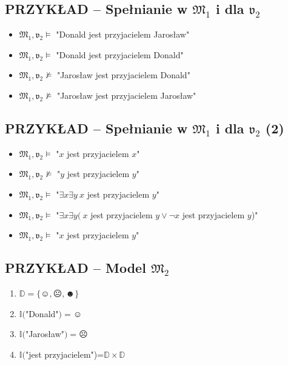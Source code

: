 \documentclass[12pt]{article}
\begin{document}
\subsection{PRZYKŁAD -- Spełnianie w $\mathfrak{M}_1$ i dla $\mathfrak{v}_2$}
%
\begin{itemize}
\item $\mathfrak{M}_1,\mathfrak{v}_2 \vDash$ "Donald jest przyjacielem Jarosław"%
\item $\mathfrak{M}_1,\mathfrak{v}_2 \vDash$ "Donald jest przyjacielem Donald"%
\item $\mathfrak{M}_1,\mathfrak{v}_2 \not \vDash$ "Jarosław jest przyjacielem Donald"%
\item $\mathfrak{M}_1,\mathfrak{v}_2 \not \vDash$ "Jarosław jest przyjacielem Jarosław"
\end{itemize}
%

\subsection{PRZYKŁAD -- Spełnianie w $\mathfrak{M}_1$ i dla $\mathfrak{v}_2$ (2)}
%
\begin{itemize}
\item $\mathfrak{M}_1,\mathfrak{v}_2 \vDash$ "$x$ jest przyjacielem $x$"%
\item $\mathfrak{M}_1,\mathfrak{v}_2 \not \vDash$ "$y$ jest przyjacielem $y$"%
\item $\mathfrak{M}_1,\mathfrak{v}_2 \vDash$ "$\exists x \exists y ~x$ jest przyjacielem $y$"%
\item $\mathfrak{M}_1,\mathfrak{v}_2 \vDash$ "$\exists x \exists y ( ~x$ jest przyjacielem $y \lor \neg x$ jest przyjacielem $y$)"%
\item $\mathfrak{M}_1,\mathfrak{v}_2 \vDash$ "$x$ jest przyjacielem $y$"
\end{itemize}
%

\subsection{PRZYKŁAD -- Model $\mathfrak{M}_2$}
%
\begin{enumerate}
    \item $\mathbb{D} = \{\smiley{}, \frownie{}, \blacksmiley{} \}$%
    \item $\mathbb{I}($"Donald"$)=\smiley{}$%
    \item $\mathbb{I}($"Jarosław"$)=\frownie{}$%
    \item $\mathbb{I}($"jest przyjacielem")=$\mathbb{D} \times \mathbb{D}$
\end{enumerate}
%
\end{document}
